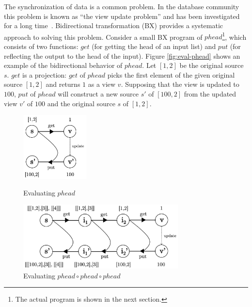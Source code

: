 The synchronization of data is a common problem. In the database community this problem is known as ``the view update problem'' and has been investigated for a long time~\cite{Bancilhon:1981:USR:319628.319634}. Bidirectional transformation (BX) provides a systematic approach to solving this problem.
Consider a small BX program of $phead$\footnote{The actual program is shown in the next section.}, which consists of two functions: $get$ (for getting the head of an input list) and $put$ (for reflecting the output to the head of the input). Figure \ref{fig:eval-phead} shows an example of the bidirectional behavior of $phead$.
Let $[1,2]$ be the original source~$s$.
$get$ is a projection: $get$ of $phead$ picks the first element of the given original source $[1,2]$ and returns $1$ as a view $v$.
Supposing that the view is updated to $100$,
$put$ of $phead$ will construct a new source $s'$ of ${[100,2]}$ from the updated view $v'$ of $100$ and the original source $s$ of $[1,2]$.

\begin{figure}[!t]
  \begin{minipage}{0.3\textwidth}
    \centering
    \includegraphics[height=3.5cm]{./fig/fig1.eps}
    \caption{Evaluating $phead$}
    \label{fig:eval-phead}
  \end{minipage}\hfill
  \begin{minipage}{0.7\textwidth}
    \centering
    \includegraphics[height=3.5cm]{./fig/fig2.eps}
    \caption{Evaluating $phead \circ phead \circ phead$}
    \label{fig:eval-comp-phead}
  \end{minipage}
\end{figure}




